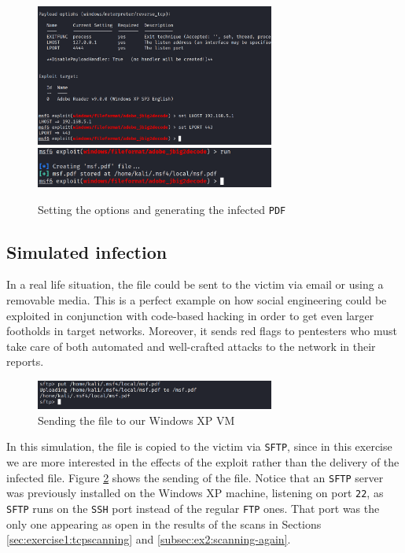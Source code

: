 \begin{figure}[htbp]
    \centering
    \includegraphics[width=0.7\textwidth]{../drawable/exercise_3_screenshots/module_set_options.png}
    \includegraphics[width=0.7\textwidth]{../drawable/exercise_3_screenshots/run_exploit.png}
    \caption{Setting the options and generating the infected \texttt{PDF}}
    \label{fig:ex3:running-exploit}
\end{figure}

\subsection{Simulated infection}
\label{subsec:ex3:simulated-infection}

In a real life situation, the file could be sent to the victim via email or using a removable media. This is a perfect example on how social engineering could be exploited in conjunction with code-based hacking in order to get even larger footholds in target networks. Moreover, it sends red flags to pentesters who must take care of both automated and well-crafted attacks to the network in their reports.
\begin{figure}[htbp]
    \centering
    \includegraphics[width=0.7\textwidth]{../drawable/exercise_3_screenshots/put_completed.png}
    \caption{Sending the file to our Windows XP VM}
    \label{fig:ex3:sending-file}
\end{figure}

In this simulation, the file is copied to the victim via \texttt{SFTP}, since in this exercise we are more interested in the effects of the exploit rather than the delivery of the infected file. Figure \ref{fig:ex3:sending-file} shows the sending of the file. Notice that an \texttt{SFTP} server was previously installed on the Windows XP machine, listening on port \texttt{22}, as \texttt{SFTP} runs on the \texttt{SSH} port instead of the regular \texttt{FTP} ones. That port was the only one appearing as open in the results of the scans in Sections \ref{sec:exercise1:tcpscanning} and \ref{subsec:ex2:scanning-again}.

